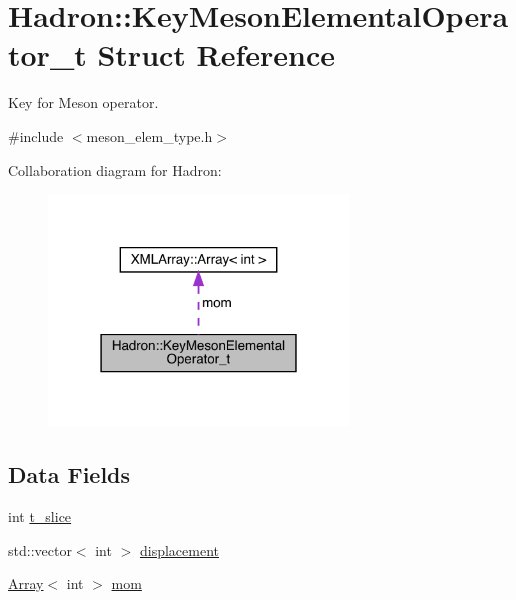 \hypertarget{structHadron_1_1KeyMesonElementalOperator__t}{}\section{Hadron\+:\+:Key\+Meson\+Elemental\+Operator\+\_\+t Struct Reference}
\label{structHadron_1_1KeyMesonElementalOperator__t}


Key for Meson operator.  




{\ttfamily \#include $<$meson\+\_\+elem\+\_\+type.\+h$>$}



Collaboration diagram for Hadron\+:\nopagebreak
\begin{figure}[H]
\begin{center}
\leavevmode
\includegraphics[width=226pt]{d3/dd1/structHadron_1_1KeyMesonElementalOperator__t__coll__graph}
\end{center}
\end{figure}
\subsection*{Data Fields}
\begin{DoxyCompactItemize}
\item 
int \mbox{\hyperlink{structHadron_1_1KeyMesonElementalOperator__t_ac241fd9a6af31e081d2582ce0389a3a4}{t\+\_\+slice}}
\item 
std\+::vector$<$ int $>$ \mbox{\hyperlink{structHadron_1_1KeyMesonElementalOperator__t_ad634e00ae5b9c58fbe44e11e2df719c0}{displacement}}
\item 
\mbox{\hyperlink{classXMLArray_1_1Array}{Array}}$<$ int $>$ \mbox{\hyperlink{structHadron_1_1KeyMesonElementalOperator__t_ab92553f02e0195a68148007008b0ef34}{mom}}
\end{DoxyCompactItemize}


